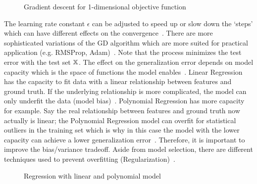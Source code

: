 \begin{figure}
    \centering
    
    \caption[Gradient descent visualization]{Gradient descent for 1-dimensional objective
        function~\citep{goodfellow_deep_2016}\label{fig:grad-desc}}
\end{figure}
The learning rate constant $\epsilon$ can be adjusted to speed up or slow down the `steps' which
can have different effects on the convergence~\citep{goodfellow_deep_2016}.
There are more sophisticated variations of the \ac{GD} algorithm which are more suited for practical
application (e.g. RMSProp, Adam)~\citep{geron_hands-machine_2017}.
Note that the process minimizes the test error with the test set $\mathbb{X}$.
The effect on the generalization error depends on model capacity which is the space of functions
the model enables~\citep{goodfellow_deep_2016}.
Linear Regression has the capacity to fit data with a linear relationship between features and
ground truth.
If the underlying relationship is more complicated, the model can only underfit the data (model
bias)~\citep{goodfellow_deep_2016}.
Polynomial Regression has more capacity for example.
Say the real relationship between features and ground truth now actually is linear;
the Polynomial Regression model can overfit for statistical outliers in the training set which is why
in this case the model with the lower capacity can achieve a lower generalization
error~\citep{geron_hands-machine_2017}.
Therefore, it is important to improve the bias/variance tradeoff.
Aside from model selection, there are different techniques used to prevent overfitting
(Regularization)~\citep{goodfellow_deep_2016}.
\begin{figure}[h]
    \centering
    \caption[Regression over- and underfitting]{%
        Regression with linear and polynomial model\label{fig:examples}
    }
\end{figure}


